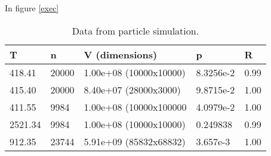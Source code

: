 \documentclass[a4paper,11pt]{article}
\begin{document}
In figure \ref{exec} 


\begin{table}[h!]
  \caption{Data from particle simulation.}
  \label{data}
  \begin{tabular}[h]{|l|l|l|l|l|}
    \hline
    T       & n     & V (dimensions)         & p          & R\\
    \hline
    418.41  & 20000 & 1.00e+08 (10000x10000) & 8.3256e-2  & 0.99 \\ 
    415.40  & 20000 & 8.40e+07 (28000x3000)  & 9.8715e-2  & 1.00 \\ 
    411.55  & 9984  & 1.00e+08 (10000x100000 & 4.0979e-2  & 1.00 \\ 
    2521.34 & 9984  & 1.00e+08 (10000x10000) & 0.249838   & 0.99 \\
    912.35  & 23744 & 5.91e+09 (85832x68832) & 3.657e-3   & 1.00 \\
    \hline
  \end{tabular}
\end{table}

\clearpage
\end{document}
